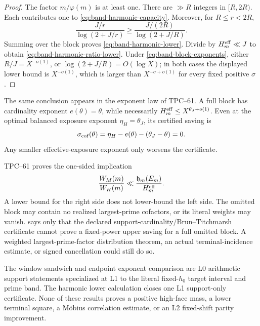\begin{proof}
The factor \(m/\varphi(m)\) is at least one.  There are \(\gg R\)
integers in \([R,2R)\).  Each contributes one to
\eqref{eq:band-harmonic-capacity}.  Moreover, for
\(R\le r<2R\),
\begin{equation}
 \frac{J/r}{\log(2+J/r)}
 \ge
 \frac{J/(2R)}{\log(2+J/R)}.
 \label{eq:band-harmonic-term-lower}
\end{equation}
Summing over the block proves \eqref{eq:band-harmonic-lower}.  Divide by
\(H_m^{\rm eff}\ll J\) to obtain
\eqref{eq:band-harmonic-ratio-lower}.  Under
\eqref{eq:band-block-exponents}, either \(R/J=X^{-o(1)}\), or
\(\log(2+J/R)=O(\log X)\); in both cases the displayed lower bound is
\(X^{-o(1)}\), which is larger than \(X^{-\sigma+o(1)}\) for every fixed
positive \(\sigma\).
\end{proof}

The same conclusion appears in the exponent law of TPC--61.  A full block
has cardinality exponent \(e(\theta)=\theta\), while necessarily
\(H_m^{\rm eff}\le X^{\theta_J+o(1)}\).  Even at the optimal balanced
exposure exponent \(\eta_H=\theta_J\), its certified saving is
\begin{equation}
 \sigma_{\rm cof}(\theta)
 =\eta_H-e(\theta)-(\theta_J-\theta)
 =0.
 \label{eq:band-zero-saving-exponent}
\end{equation}
Any smaller effective-exposure exponent only worsens the certificate.

\begin{remark}
\label{rem:band-certificate-only}
TPC--61 proves the one-sided implication
\begin{equation}
 \frac{W_M(m)}{W_H(m)}
 \ll\frac{\mathfrak h_m(E_m)}{H_m^{\rm eff}}.
 \label{eq:band-one-sided-harmonic-bound}
\end{equation}
A lower bound for the right side does not lower-bound the left side.  The
omitted block may contain no realized largest-prime cofactors, or its
literal weights may vanish.
 says only that the declared
support-cardinality/Brun--Titchmarsh certificate cannot prove a fixed-power
upper saving for a full omitted block.  A weighted largest-prime-factor
distribution theorem, an actual terminal-incidence estimate, or signed
cancellation could still do so.
\end{remark}

The window sandwich and endpoint exponent comparison are L0 arithmetic
support statements specialized at L1 to the literal fixed-\(h_0\) target
interval and prime band.  The harmonic lower calculation closes one L1
support-only certificate.  None of these results proves a positive
high-face mass, a lower terminal square, a M\"obius correlation estimate,
or an L2 fixed-shift parity improvement.
